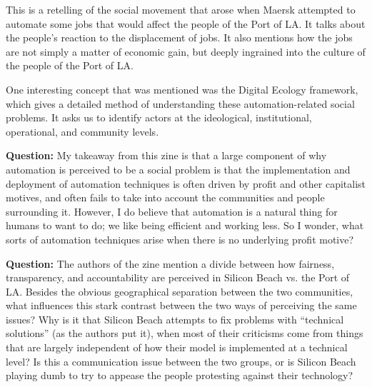This is a retelling of the social movement that arose when Maersk attempted to automate some jobs that would affect the people of the Port of LA.
It talks about the people's reaction to the displacement of jobs.
It also mentions how the jobs are not simply a matter of economic gain, but deeply ingrained into the culture of the people of the Port of LA.

One interesting concept that was mentioned was the Digital Ecology framework, which gives a detailed method of understanding these automation-related social problems.
It asks us to identify actors at the ideological, institutional, operational, and community levels.

\textbf{Question:}
My takeaway from this zine is that a large component of why automation is perceived to be a social problem is that the implementation and deployment of automation techniques is often driven by profit and other capitalist motives, and often fails to take into account the communities and people surrounding it.
However, I do believe that automation is a natural thing for humans to want to do; we like being efficient and working less.
So I wonder, what sorts of automation techniques arise when there is no underlying profit motive?

\textbf{Question:}
The authors of the zine mention a divide between how fairness, transparency, and accountability are perceived in Silicon Beach vs. the Port of LA.
Besides the obvious geographical separation between the two communities, what influences this stark contrast between the two ways of perceiving the same issues?
Why is it that Silicon Beach attempts to fix problems with ``technical solutions'' (as the authors put it), when most of their criticisms come from things that are largely independent of how their model is implemented at a technical level?
Is this a communication issue between the two groups, or is Silicon Beach playing dumb to try to appease the people protesting against their technology?